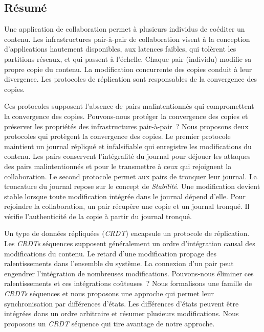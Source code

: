 \cleardoublepage
\pagestyle{empty} %

\AbstractsOnEvenPage
\begin{ThesisAbstract}
\vspace{-7em}
\small

\subsection*{\centering Résumé}

Une application de collaboration permet à plusieurs individus de coéditer un contenu.
Les infrastructures pair-à-pair de collaboration visent à la conception d'applications hautement disponibles, aux latences faibles, qui tolèrent les partitions réseaux, et qui passent à l'échelle.
Chaque pair (individu) modifie sa propre copie du contenu.
La modification concurrente des copies conduit à leur divergence.
Les protocoles de réplication sont responsables de la convergence des copies.

Ces protocoles supposent l'absence de pairs malintentionnés qui compromettent la convergence des copies.
Pouvons-nous protéger la convergence des copies et préserver les propriétés des infrastructures pair-à-pair~?
Nous proposons deux protocoles qui protègent la convergence des copies.
Le premier protocole maintient un journal répliqué et infalsifiable qui enregistre les modifications du contenu.
Les pairs conservent l'intégralité du journal pour déjouer les attaques des pairs malintentionnés et pour le transmettre à ceux qui rejoignent la collaboration.
Le second protocole permet aux pairs de tronquer leur journal.
La troncature du journal repose sur le concept de \emph{Stabilité}.
Une modification devient stable lorsque toute modification intégrée dans le journal dépend d'elle.
Pour rejoindre la collaboration, un pair récupère une copie et un journal tronqué.
Il vérifie l'authenticité de la copie à partir du journal tronqué.

Un type de données répliquées (\emph{CRDT}) encapsule un protocole de réplication.
Les \emph{CRDTs} séquences supposent généralement un ordre d'intégration causal des modifications du contenu.
Le retard d'une modification propage des ralentissements dans l'ensemble du système.
La connexion d'un pair peut engendrer l'intégration de nombreuses modifications.
Pouvons-nous éliminer ces ralentissements et ces intégrations coûteuses~?
Nous formalisons une famille de \emph{CRDTs} séquences et nous proposons une approche qui permet leur synchronisation par différences d'états.
Les différences d'états peuvent être intégrées dans un ordre arbitraire et résumer plusieurs modifications.
Nous proposons un \emph{CRDT} séquence qui tire avantage de notre approche.


\end{ThesisAbstract}
